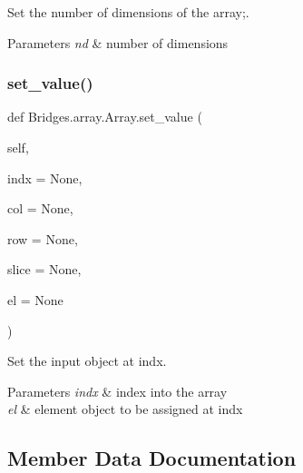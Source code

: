 Set the number of dimensions of the array;. 


\begin{DoxyParams}{Parameters}
{\em nd} & number of dimensions \\
\hline
\end{DoxyParams}
\mbox{\label{class_bridges_1_1array_1_1_array_ae89fab48c57356c500f9bc96ed57ec0a}} 
\subsubsection{\texorpdfstring{set\+\_\+value()}{set\_value()}}
{\footnotesize\ttfamily def Bridges.\+array.\+Array.\+set\+\_\+value (\begin{DoxyParamCaption}\item[{}]{self,  }\item[{}]{indx = {\ttfamily None},  }\item[{}]{col = {\ttfamily None},  }\item[{}]{row = {\ttfamily None},  }\item[{}]{slice = {\ttfamily None},  }\item[{}]{el = {\ttfamily None} }\end{DoxyParamCaption})}



Set the input object at \textquotesingle{}indx\textquotesingle{}. 


\begin{DoxyParams}{Parameters}
{\em indx} & index into the array \\
\hline
{\em el} & element object to be assigned at \textquotesingle{}indx\textquotesingle{} \\
\hline
\end{DoxyParams}


\subsection{Member Data Documentation}
\mbox{\label{class_bridges_1_1array_1_1_array_a2feba9dfd52b01c5b08a477743d33145}} 
